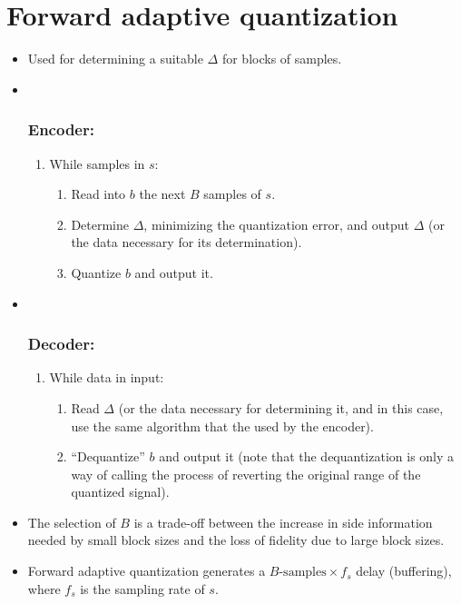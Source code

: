 \section{Forward adaptive quantization}
\begin{itemize}
\item
  Used for determining a suitable \(\Delta\) for blocks of samples.
\item ~
  \hypertarget{encoder}{%
  \subsubsection{Encoder:}\label{encoder}}

  \begin{enumerate}
  \def\labelenumi{\arabic{enumi}.}
  \tightlist
  \item
    While samples in \(s\):

    \begin{enumerate}
    \def\labelenumii{\arabic{enumii}.}
    \tightlist
    \item
      Read into \(b\) the next \(B\) samples of \(s\).
    \item
      Determine \(\Delta\), minimizing the quantization error, and
      output \(\Delta\) (or the data necessary for its determination).
    \item
      Quantize \(b\) and output it.
    \end{enumerate}
  \end{enumerate}
\item ~
  \hypertarget{decoder}{%
  \subsubsection{Decoder:}\label{decoder}}

  \begin{enumerate}
  \def\labelenumi{\arabic{enumi}.}
  \tightlist
  \item
    While data in input:

    \begin{enumerate}
    \def\labelenumii{\arabic{enumii}.}
    \tightlist
    \item
      Read \(\Delta\) (or the data necessary for determining it, and in
      this case, use the same algorithm that the used by the encoder).
    \item
      ``Dequantize'' \(b\) and output it (note that the dequantization
      is only a way of calling the process of reverting the original
      range of the quantized signal).
    \end{enumerate}
  \end{enumerate}
\item
  The selection of \(B\) is a trade-off between the increase in side
  information needed by small block sizes and the loss of fidelity due
  to large block sizes.
\item
  Forward adaptive quantization generates a
  \(B\text{-samples}\times f_s\) delay (buffering), where \(f_s\) is the
  sampling rate of \(s\).
\end{itemize}

